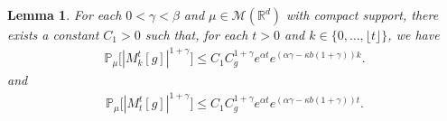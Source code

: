 \documentclass[12pt, a4paper]{amsart}
\newtheorem{lem}[thm]{Lemma}
\theoremstyle{definition}
\numberwithin{equation}{section}
\begin{document}
\begin{lem}\label{lem: lemma23}
For each $0< \gamma < \beta$ and $\mu \in \mathcal M(\mathbb R^d)$ with compact support, there exists a constant $C_1>0$ such that, for each $t >0$ and $k \in \{0,\dots,\lfloor t \rfloor\}$, we have
\begin{align}
\label{eq: upper bound of 1+gamma moment of Mktg}
    \mathbb P_\mu\big[|M_k^t[g]|^{1+\gamma}\big]
    \leq C_1 C_g^{1+\gamma}e^{\alpha t}e^{(\alpha \gamma - \kappa b(1+\gamma))k}.
\end{align}
and
\begin{align}
    \mathbb P_\mu\big[|M_t^t[g]|^{1+\gamma}\big]
    \leq C_1 C_g^{1+\gamma}e^{\alpha t}e^{(\alpha \gamma - \kappa b(1+\gamma))t}.
\end{align}
\end{lem}
\end{document}
